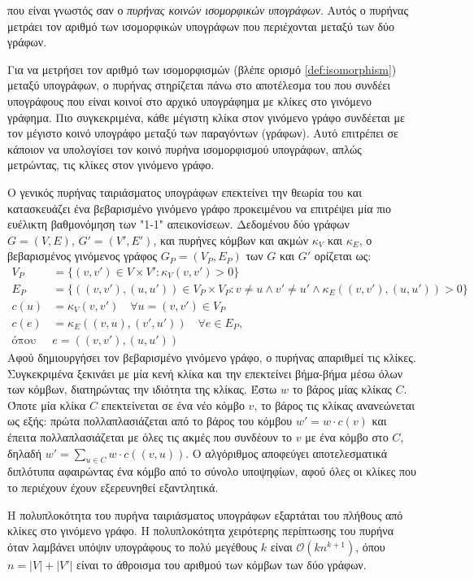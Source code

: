 που είναι γνωστός σαν ο \textit{πυρήνας κοινών ισομορφικών υπογράφων}.
Αυτός ο πυρήνας μετράει τον αριθμό των ισομορφικών υπογράφων που περιέχονται μεταξύ των δύο γράφων.\par
Για να μετρήσει τον αριθμό των ισομορφισμών (βλέπε ορισμό \ref{def:isomorphism}) μεταξύ υπογράφων, ο πυρήνας στηρίζεται πάνω στο αποτέλεσμα του  \cite{levi1973note} που συνδέει υπογράφους που είναι κοινοί στο αρχικό υπογράφημα με κλίκες στο γινόμενο γράφημα.
Πιο συγκεκριμένα, κάθε μέγιστη κλίκα στον γινόμενο γράφο συνδέεται με τον μέγιστο κοινό υπογράφο μεταξύ των παραγόντων (γράφων).
Αυτό επιτρέπει σε κάποιον να υπολογίσει τον κοινό πυρήνα ισομορφισμού υπογράφων, απλώς μετρώντας, τις κλίκες στον γινόμενο γράφο.\par
Ο γενικός πυρήνας ταιριάσματος υπογράφων επεκτείνει την θεωρία του  και κατασκευάζει ένα βεβαρισμένο γινόμενο γράφο προκειμένου να επιτρέψει μία πιο ευέλικτη βαθμονόμηση των "1-1" απεικονίσεων.
Δεδομένου δύο γράφων $G=(V,E)$, $G'=(V',E')$, και πυρήνες κόμβων και ακμών $\kappa_V$ και $\kappa_E$, ο βεβαρισμένος γινόμενος γράφος $G_P=(V_P, E_P)$ των $G$ και $G'$ ορίζεται ως:
\begin{equation}
    \begin{split}
        V_P &= \{ (v,v') \in V \times V' : \kappa_V(v,v') > 0 \} \\
        E_P &= \{ ((v,v'),(u,u')) \in V_P \times V_P : v \neq u \wedge v' \neq u' \wedge \kappa_E((v,v'),(u,u')) > 0 \} \\
        c(u) &= \kappa_V(v,v') \quad \forall u=(v,v') \in V_P \\
        c(e) &= \kappa_E((v,u),(v',u')) \quad \forall e \in E_P, \\
        \text{όπου } &e=((v,v'),(u,u')) 
    \end{split}
\end{equation}
Αφού δημιουργήσει τον βεβαρισμένο γινόμενο γράφο, ο πυρήνας απαριθμεί τις κλίκες.
Συγκεκριμένα ξεκινάει με μία κενή κλίκα και την επεκτείνει βήμα-βήμα μέσω όλων των κόμβων, διατηρώντας την ιδιότητα της κλίκας. 
Έστω $w$ το βάρος μίας κλίκας $C$.
Όποτε μία κλίκα $C$ επεκτείνεται σε ένα νέο κόμβο $v$, το βάρος τις κλίκας ανανεώνεται ως εξής: πρώτα πολλαπλασιάζεται από το βάρος του κόμβου $w' = w \cdot c(v)$ και έπειτα πολλαπλασιάζεται με όλες τις ακμές που συνδέουν το $v$ με ένα κόμβο στο $C$, δηλαδή $w' = \sum_{u \in C} w \cdot c((v,u))$.
Ο αλγόριθμος αποφεύγει αποτελεσματικά διπλότυπα αφαιρώντας ένα κόμβο από το σύνολο υποψηφίων, αφού όλες οι κλίκες που το περιέχουν έχουν εξερευνηθεί εξαντλητικά.\par
Η πολυπλοκότητα του πυρήνα ταιριάσματος υπογράφων εξαρτάται του πλήθους από κλίκες στο γινόμενο γράφο.
Η πολυπλοκότητα χειρότερης περίπτωσης του πυρήνα όταν λαμβάνει υπόψιν υπογράφους το πολύ μεγέθους $k$ είναι $\mathcal{O}(kn^{k+1})$, όπου $n=|V|+|V'|$ είναι το άθροισμα του αριθμού των κόμβων των δύο γράφων.

